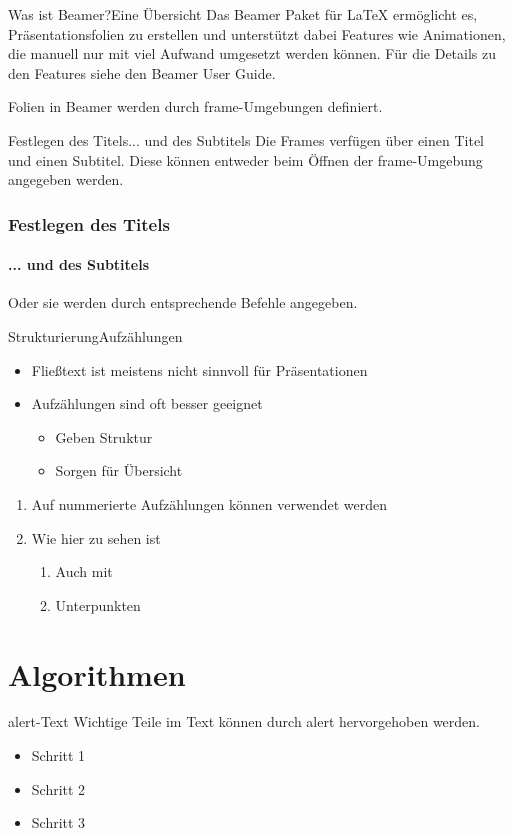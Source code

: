 \documentclass[t,aspectratio=169,dvipsnames]{beamer}
\begin{document}
\begin{frame}{Was ist Beamer?}{Eine Übersicht}
Das Beamer Paket für \LaTeX{} ermöglicht es, Präsentationsfolien zu erstellen und unterstützt dabei Features wie Animationen, die manuell nur mit viel Aufwand umgesetzt werden können.
Für die Details zu den Features siehe den Beamer User Guide\cite{BeamerDoc}.
\end{frame}

\begin{frame}
Folien in Beamer werden durch frame-Umgebungen definiert.
\end{frame}

\begin{frame}{Festlegen des Titels}{... und des Subtitels}
Die Frames verfügen über einen Titel und einen Subtitel.
Diese können entweder beim Öffnen der frame-Umgebung angegeben werden.
\end{frame}

\begin{frame}
	\frametitle{Festlegen des Titels}
	\framesubtitle{... und des Subtitels}
	Oder sie werden durch entsprechende Befehle angegeben.
\end{frame}

\begin{frame}{Strukturierung}{Aufzählungen}
\begin{itemize}
	\item Fließtext ist meistens nicht sinnvoll für Präsentationen
	\item Aufzählungen sind oft besser geeignet
	\begin{itemize}
		\item Geben Struktur
		\item Sorgen für Übersicht
	\end{itemize}
\end{itemize}
\begin{enumerate}
	\item Auf nummerierte Aufzählungen können verwendet werden
	\item Wie hier zu sehen ist
	\begin{enumerate}
		\item Auch mit
		\item Unterpunkten
	\end{enumerate} 
\end{enumerate}
\end{frame}

\section{Algorithmen}
\begin{frame}{alert-Text}
	Wichtige Teile im Text können \alert<2>{durch alert hervorgehoben} werden.
	\begin{itemize}[<+-|alert@+>]
		\item Schritt 1
		\item Schritt 2
		\item Schritt 3
	\end{itemize}
\end{frame}
\end{document}
